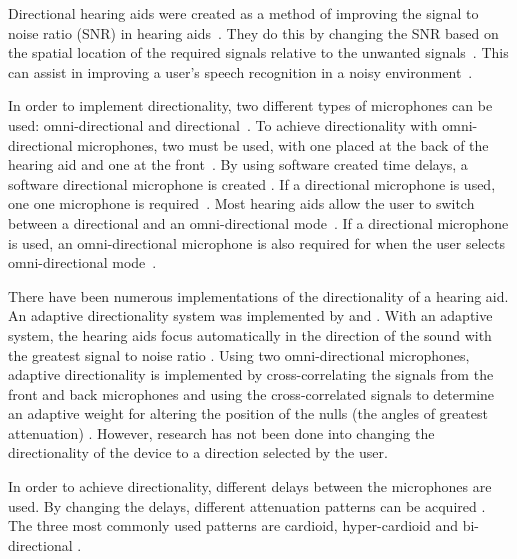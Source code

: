 \documentclass[10pt,twocolumn]{witseiepaper}
\begin{document}
Directional hearing aids were created as a method of improving the signal to noise ratio (SNR) in hearing aids~\cite{trends_in_amplification}. They do this by changing the SNR based on the spatial location of the required signals relative to the unwanted signals~\cite{trends_in_amplification}. This can assist in improving a user's speech recognition in a noisy environment~\cite{trends_in_amplification}. 
 
In order to implement directionality, two different types of microphones can be used: omni-directional and directional~\cite{An_ultra_low_power_analogue_directionality, trends_in_amplification}. To achieve directionality with omni-directional microphones, two must be used, with one placed at the back of the hearing aid and one at the front~\cite{An_ultra_low_power_analogue_directionality, trends_in_amplification}. By using software created time delays, a software directional microphone is created \cite{Distortion_of_interaural_time_cues}. If a directional microphone is used, one one microphone is required~\cite{trends_in_amplification}. Most hearing aids allow the user to switch between a directional and an omni-directional mode~\cite{trends_in_amplification}. If a directional microphone is used, an omni-directional microphone is also required for when the user selects omni-directional mode~\cite{trends_in_amplification}.

There have been numerous implementations of the directionality of a hearing aid. An adaptive directionality system was implemented by \cite{An_ultra_low_power_analogue_directionality} and \cite{Evaluation_of_digital_hearing_aid_algorithms}. With an adaptive system, the hearing aids focus automatically in the direction of the sound with the greatest signal to noise ratio \cite{An_ultra_low_power_analogue_directionality}. Using two omni-directional microphones, adaptive directionality is implemented by cross-correlating the signals from the front and back microphones and using the cross-correlated signals to determine an adaptive weight for altering the position of the nulls (the angles of greatest attenuation) \cite{An_ultra_low_power_analogue_directionality}. However, research has not been done into changing the directionality of the device to a direction selected by the user.

In order to achieve directionality, different delays between the microphones are used. By changing the delays, different attenuation patterns can be acquired \cite{trends_in_amplification, Distortion_of_interaural_time_cues}. The three most commonly used patterns are cardioid, hyper-cardioid and bi-directional \cite{trends_in_amplification}.
\end{document}
